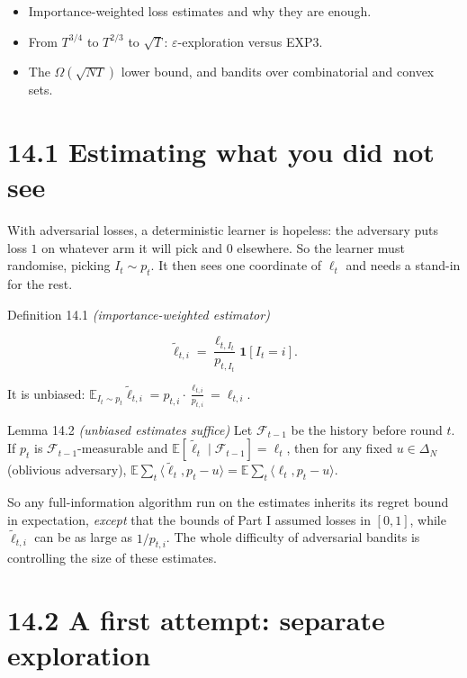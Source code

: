 \documentclass[11pt,a4paper,openany]{book}
\newcommand{\E}{\mathbb{E}}
\newcommand{\eps}{\varepsilon}
\newcommand{\ind}{\mathbf{1}}
\newcommand{\ip}[2]{\langle #1,#2\rangle}
\newcommand{\simplex}{\Delta}
\begin{document}
\begin{goals}
\begin{itemize}
\item Importance-weighted loss estimates and why they are enough.
\item From $T^{3/4}$ to $T^{2/3}$ to $\sqrt T$: $\eps$-exploration versus EXP3.
\item The $\Omega(\sqrt{NT})$ lower bound, and bandits over combinatorial and convex sets.
\end{itemize}
\end{goals}

\section*{14.1 Estimating what you did not see}\label{ch14-est}

With adversarial losses, a deterministic learner is hopeless: the adversary puts loss $1$ on whatever arm it will pick and $0$ elsewhere. So the learner must randomise, picking $I_t\sim p_t$. It then sees one coordinate of $\ell_t$ and needs a stand-in for the rest.

\begin{bdef}{Definition 14.1 \emph{(importance-weighted estimator)}}

\[\tilde\ell_{t,i}=\frac{\ell_{t,I_t}}{p_{t,I_t}}\ind[I_t=i].\]

It is unbiased: $\E_{I_t\sim p_t}\tilde\ell_{t,i}=p_{t,i}\cdot\frac{\ell_{t,i}}{p_{t,i}}=\ell_{t,i}$.
\end{bdef}

\begin{bthm}{Lemma 14.2 \emph{(unbiased estimates suffice)}}
Let $\mathcal F_{t-1}$ be the history before round $t$. If $p_t$ is $\mathcal F_{t-1}$-measurable and $\E[\tilde\ell_t\mid\mathcal F_{t-1}]=\ell_t$, then for any fixed $u\in\simplex_N$ (oblivious adversary), $\E\sum_t\ip{\tilde\ell_t}{p_t-u}=\E\sum_t\ip{\ell_t}{p_t-u}$.
\end{bthm}

So any full-information algorithm run on the estimates inherits its regret bound in expectation, \emph{except} that the bounds of Part I assumed losses in $[0,1]$, while $\tilde\ell_{t,i}$ can be as large as $1/p_{t,i}$. The whole difficulty of adversarial bandits is controlling the size of these estimates.

\section*{14.2 A first attempt: separate exploration}\label{ch14-eps}
\end{document}

